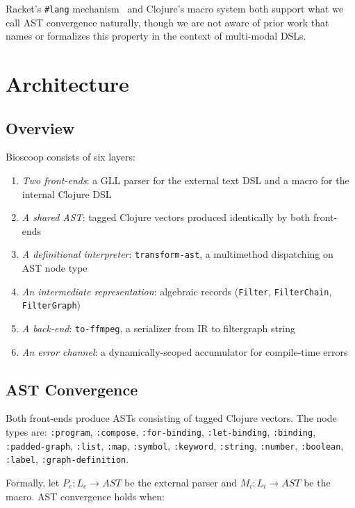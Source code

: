 \documentclass[conference]{IEEEtran}
\begin{document}
Racket's \texttt{\#lang} mechanism~\cite{racket} and Clojure's macro system both support what we call AST convergence naturally, though we are not aware of prior work that names or formalizes this property in the context of multi-modal DSLs.

\section{Architecture}

\subsection{Overview}

Bioscoop consists of six layers:

\begin{enumerate}
\item \emph{Two front-ends}: a GLL parser for the external text DSL and a macro for the internal Clojure DSL
\item \emph{A shared AST}: tagged Clojure vectors produced identically by both front-ends
\item \emph{A definitional interpreter}: \texttt{transform-ast}, a multimethod dispatching on AST node type
\item \emph{An intermediate representation}: algebraic records (\texttt{Filter}, \texttt{FilterChain}, \texttt{FilterGraph})
\item \emph{A back-end}: \texttt{to-ffmpeg}, a serializer from IR to filtergraph string
\item \emph{An error channel}: a dynamically-scoped accumulator for compile-time errors
\end{enumerate}

\subsection{AST Convergence}

Both front-ends produce ASTs consisting of tagged Clojure vectors. The node types are: \texttt{:program}, \texttt{:compose}, \texttt{:for-binding}, \texttt{:let-binding}, \texttt{:binding}, \texttt{:padded-graph}, \texttt{:list}, \texttt{:map}, \texttt{:symbol}, \texttt{:keyword}, \texttt{:string}, \texttt{:number}, \texttt{:boolean}, \texttt{:label}, \texttt{:graph-definition}.

Formally, let $P_e : L_e \rightarrow AST$ be the external parser and $M_i : L_i \rightarrow AST$ be the macro. AST convergence holds when:
\end{document}
